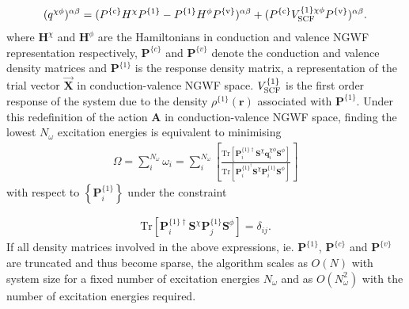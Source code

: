 \documentclass[letterpaper,10pt,english]{sphinxmanual}
\begin{document}
\label{\detokenize{lr_tddft:equation-operator}}\begin{equation}\label{equation:lr_tddft:operator}
\begin{split}(q^{\chi\phi})^{\alpha\beta}=(P^{\{\mathrm{c}\}} H^{\chi}P^{\{1\}}-P^{\{1\}} H^{\phi}P^{\{\mathrm{v}\}})^{\alpha\beta}
+(P^{\{\mathrm{c}\}} V^{\{1\}\chi\phi}_{\textrm{\scriptsize{SCF}}}P^{\{\mathrm{v}\}})^{\alpha\beta}.\end{split}
\end{equation}
where \(\textbf{H}^{\chi}\) and \(\textbf{H}^\phi\) are the
Hamiltonians in conduction and valence NGWF representation respectively,
\(\textbf{P}^{\{c\}}\) and \(\textbf{P}^{\{v\}}\) denote the
conduction and valence density matrices and \(\textbf{P}^{\{1\}}\)
is the response density matrix, a representation of the trial vector
\(\vec{\textbf{X}}\) in conduction-valence NGWF space.
\(V^{\{1\}}_{\textrm{\scriptsize{SCF}}}\) is the first order
response of the system due to the density
\(\rho^{\{1\}}(\textbf{r})\) associated with
\(\textbf{P}^{\{1\}}\). Under this redefinition of the action
\(\textbf{A}\) in conduction-valence NGWF space, finding the lowest
\(N_\omega\) excitation energies is equivalent to minimising
\begin{equation*}
\begin{split}\Omega=\sum_i^{N_\omega}\omega_i=\sum_i^{N_{\omega}}\left[  \frac{\textrm{Tr}\left[\textbf{P}^{\{1\}\dagger}_i\textbf{S}^{\chi}\textbf{q}^{\chi\phi}_i\textbf{S}^\phi\right]}{\textrm{Tr}\left[\textbf{P}^{\{1\}^\dagger}_i\textbf{S}^{\chi}\textbf{P}^{\{1\}}_i\textbf{S}^\phi\right]}\right]\end{split}
\end{equation*}
with respect to \(\left\{ \textbf{P}^{\{1\}}_i\right\}\) under the
constraint

\label{\detokenize{lr_tddft:equation-ortho}}\begin{equation}\label{equation:lr_tddft:ortho}
\begin{split} \textrm{Tr}\left[\textbf{P}^{\{1\}\dagger}_i\textbf{S}^{\chi}\textbf{P}^{\{1\}}_j\textbf{S}^\phi\right]=\delta_{ij}.\end{split}
\end{equation}
If all density matrices involved in the above expressions, ie.
\(\textbf{P}^{\{1\}}\), \(\textbf{P}^{\{c\}}\) and
\(\textbf{P}^{\{v\}}\) are truncated and thus become sparse, the
algorithm scales as \(O(N)\) with system size for a fixed number of
excitation energies \(N_\omega\) and as \(O(N_\omega^2)\) with
the number of excitation energies required.
\end{document}
